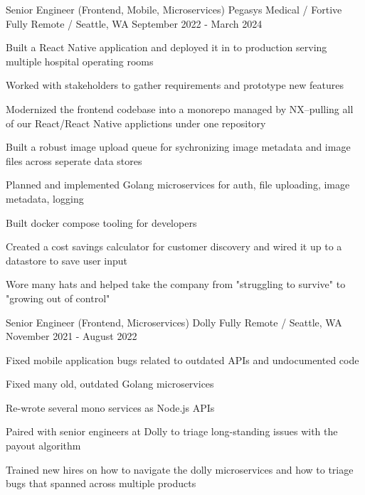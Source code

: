 

\begin{cventries}
  \cventry
    {Senior Engineer (Frontend, Mobile, Microservices)} %
    {Pegasys Medical / Fortive} %
    {Fully Remote / Seattle, WA} %
    {September 2022 - March 2024} %
    {
      \begin{cvitems} %
        \item {Built a React Native application and deployed it in to production serving multiple hospital operating rooms}
        \item {Worked with stakeholders to gather requirements and prototype new features}
        \item {Modernized the frontend codebase into a monorepo managed by NX--pulling all of our React/React Native applictions under one repository}
        \item {Built a robust image upload queue for sychronizing image metadata and image files across seperate data stores}
        \item {Planned and implemented Golang microservices for auth, file uploading, image metadata, logging}
        \item {Built docker compose tooling for developers}
        \item {Created a cost savings calculator for customer discovery and wired it up to a datastore to save user input}
        \item {Wore many hats and helped take the company from "struggling to survive" to "growing out of control"}
      \end{cvitems}
    }

  \cventry
    {Senior Engineer (Frontend, Microservices)} %
    {Dolly} %
    {Fully Remote / Seattle, WA} %
    {November 2021 - August 2022} %
    {
      \begin{cvitems} %
        \item {Fixed mobile application bugs related to outdated APIs and undocumented code}
        \item {Fixed many old, outdated Golang microservices}
        \item {Re-wrote several mono services as Node.js APIs}
        \item {Paired with senior engineers at Dolly to triage long-standing issues with the payout algorithm}
        \item {Trained new hires on how to navigate the dolly microservices and how to triage bugs that spanned across multiple products}
      \end{cvitems}
    }


\end{cventries}
